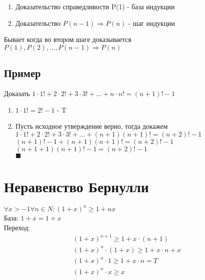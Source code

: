 \documentclass[letterpaper]{article}
\begin{document}
\begin{enumerate}
\item Доказательство справедливости P(1) - база индукции\\
\item Доказательство \(P(n - 1) \Rightarrow P(n)\) - шаг индукции\\
\end{enumerate}

Бывает когда во втором шаге доказывается \(P(1), P(2), \ldots, P(n - 1) \Rightarrow P(n)\)\\
\subsection{Пример}
\label{sec:org5af2451}
Доказать \(1 \cdot 1! + 2 \cdot 2! + 3 \cdot 3! + \ldots + n \cdot n! = (n + 1)! - 1\)\\

\begin{enumerate}
\item \(1 \cdot 1! = 2! - 1\) - T\\
\item Пусть исходное утверждение верно, тогда докажем \(1 \cdot 1! + 2 \cdot 2! + 3 \cdot 3! + \ldots + (n + 1)(n + 1)! = (n + 2)! - 1\)\\

\((n + 1)! - 1 + (n + 1)(n + 1)! = (n + 2)! - 1\)\\

\((n + 1 + 1)(n + 1)! - 1 = (n + 2)! - 1\)\\

\(\blacksquare\)\\
\end{enumerate}
\section{Неравенство Бернулли}
\label{sec:orgb4679cf}
\(\forall x > -1 \forall n \in N: (1 + x)^n \geq 1 + nx\)\\

База: \(1 + x = 1 + x\)\\

Переход:\\
\begin{equation}
\begin{aligned}
(1 + x)^{n + 1} \geq 1 + x \cdot (n + 1) \\
(1 + x)^n \cdot (1 + x) \geq 1 + x \cdot n + x \\
(1 + x)^n \cdot 1 \geq 1 + x \cdot n = T \\
(1 + x)^n \cdot x \geq x
\end{aligned}
\end{equation}
\end{document}
